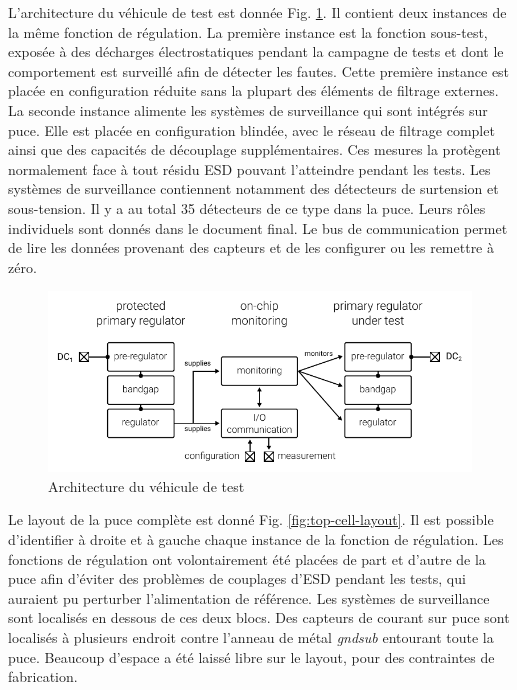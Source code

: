 L'architecture du véhicule de test est donnée Fig. \ref{architecture_testchip}.
Il contient deux instances de la même fonction de régulation.
La première instance est la fonction sous-test, exposée à des décharges électrostatiques pendant la campagne de tests et dont le comportement est surveillé afin de détecter les fautes.
Cette première instance est placée en configuration réduite sans la plupart des éléments de filtrage externes.
La seconde instance alimente les systèmes de surveillance qui sont intégrés sur puce.
Elle est placée en configuration blindée, avec le réseau de filtrage complet ainsi que des capacités de découplage supplémentaires.
Ces mesures la protègent normalement face à tout résidu ESD pouvant l'atteindre pendant les tests.
Les systèmes de surveillance contiennent notamment des détecteurs de surtension et sous-tension.
Il y a au total 35 détecteurs de ce type dans la puce.
Leurs rôles individuels sont donnés dans le document final.
Le bus de communication permet de lire les données provenant des capteurs et de les configurer ou les remettre à zéro.

\begin{figure}[h]
  \centering
  \includegraphics{src/1/figures/architecture_testchip.pdf}
  \caption{Architecture du véhicule de test}
  \label{architecture_testchip}
\end{figure}

Le layout de la puce complète est donné Fig. \ref{fig:top-cell-layout}.
Il est possible d'identifier à droite et à gauche chaque instance de la fonction de régulation.
Les fonctions de régulation ont volontairement été placées de part et d'autre de la puce afin d'éviter des problèmes de couplages d'ESD pendant les tests, qui auraient pu perturber l'alimentation de référence.
Les systèmes de surveillance sont localisés en dessous de ces deux blocs.
Des capteurs de courant sur puce sont localisés à plusieurs endroit contre l'anneau de métal \textit{gndsub} entourant toute la puce.
Beaucoup d'espace a été laissé libre sur le layout, pour des contraintes de fabrication.

